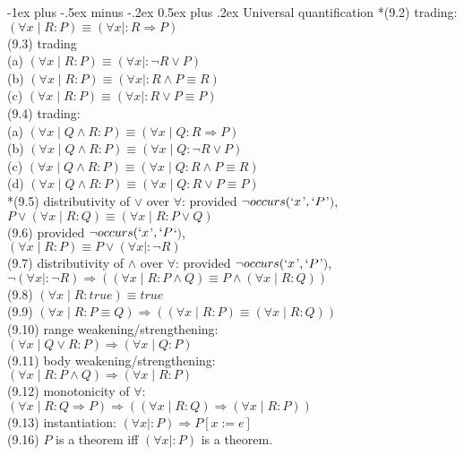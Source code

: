 \documentclass[10pt,landscape]{article}
\makeatletter
\renewcommand{\subsection}{\@startsection{subsection}{2}{0mm}%
                                {-1ex plus -.5ex minus -.2ex}%
                                {0.5ex plus .2ex}%
                                {\normalfont\small\bfseries}}
\makeatother
\begin{document}
\begin{multicols}{3}
{\subsection{Universal quantification}
*(9.2) trading: $(\forall x\mid R:P)\equiv (\forall x\mid:R\Rightarrow P)$\\
(9.3) trading\\
\qquad(a) $(\forall x\mid R:P)\equiv (\forall x\mid:\neg R\lor P)$\\
\qquad(b) $(\forall x\mid R:P)\equiv (\forall x\mid:R\land P\equiv R)$\\
\qquad(c) $(\forall x\mid R:P)\equiv (\forall x\mid: R\lor P\equiv P)$\\
(9.4) trading:\\
\qquad(a) $(\forall x\mid Q\land R:P)\equiv (\forall x\mid Q:R\Rightarrow P)$\\
\qquad(b) $(\forall x\mid Q\land R:P)\equiv (\forall x\mid Q:\neg R\lor P)$\\
\qquad(c) $(\forall x\mid Q\land R:P)\equiv (\forall x\mid Q:R\land P\equiv R)$\\
\qquad(d) $(\forall x\mid Q\land R:P)\equiv (\forall x\mid Q:R\lor P\equiv P)$\\
*(9.5) distributivity of $\lor$ over $\forall$: provided $\neg occurs(`x$'$,`P$'$)$,\\
\qquad$P\lor (\forall x\mid R:Q)\equiv (\forall x\mid R:P\lor Q)$\\
(9.6) provided $\neg occurs(`x$'$,`P$`$)$,\\ 
\qquad$(\forall x\mid R:P)\equiv P\lor (\forall x\mid:\neg R)$\\
(9.7) distributivity of $\land$ over $\forall$: provided $\neg occurs(`x$'$,`P$'$)$,\\
\qquad$\neg(\forall	x\mid:\neg R)\Rightarrow((\forall x\mid R:P\land Q)\equiv P\land (\forall x\mid R:Q))$\\
(9.8) $(\forall x\mid R:true)\equiv true$\\
(9.9) $(\forall x\mid R:P\equiv Q)\Rightarrow ((\forall x\mid R:P)\equiv (\forall x\mid R:Q))$\\
(9.10) range weakening/strengthening:\\
\qquad$(\forall x\mid Q\lor R:P)\Rightarrow(\forall x\mid Q:P)$\\
(9.11) body weakening/strengthening:\\
\qquad$(\forall x\mid R:P\land Q)\Rightarrow(\forall x\mid R:P)$\\
(9.12) monotonicity of $\forall$:\\
\qquad$(\forall x\mid R:Q\Rightarrow P)\Rightarrow ((\forall x\mid R:Q)\Rightarrow (\forall x\mid R:P))$\\
(9.13) instantiation: $(\forall x\mid: P)\Rightarrow P[x:=e]$\\
(9.16) $P$ is a theorem iff $(\forall x\mid:P)$ is a theorem.

}
\end{multicols}
\end{document}
